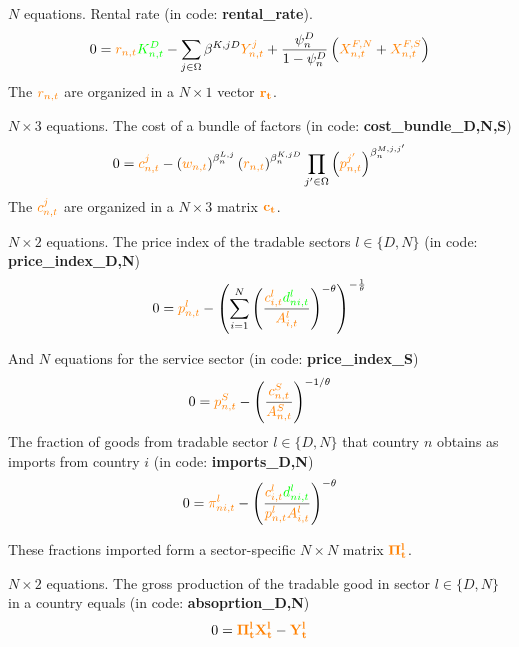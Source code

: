 \documentclass[12pt, bibtotoc, tablecaptionabove, figurecaptionabove, fleqn]{article}
\newcommand{\cl}[1]{{\color{orange}{#1}}}
\newcommand{\st}[1]{{\color{green}{#1}}}
\begin{document}
\noindent $N$ equations. Rental rate  (in code: {\bf{rental\_rate}}). 
\begin{equation}
  0 = \cl{r_{n, t}} \st{K_{n, t}^{D}}-\sum_{j \in \Omega} \beta^{K, j D} \cl{Y_{n, t}^{j}}+\frac{\psi^{D}_n} { 1-\psi^D_n }\left(\cl{X_{n, t}^{F, N}}+\cl{X_{n, t}^{F, S}}\right)
\end{equation}
The $\cl{r_{n,t}}$ are organized in a $ N \times 1$ vector $\mathbf{\cl{r_t}}$.

\noindent $N \times 3$ equations. The cost of a bundle of factors (in code: {\bf{cost\_bundle\_D,N,S}})
\begin{equation}
0 = \cl{c_{n, t}^{j}}-\left(\cl{w_{n, t}}\right)^{\beta_{n}^{L, j}}\left(\cl{r_{n, t}}\right)^{\beta_{n}^{K, j D}} \prod_{j^{\prime} \in \Omega}\left(\cl{p_{n, t}^{j^{\prime}}}\right)^{\beta_{n}^{M, j,j^{\prime}}}
\end{equation}
The $\cl{c^j_{n,t}}$ are organized in a $ N \times 3$ matrix $\mathbf{\cl{c_t}}$.


\noindent $N \times 2$ equations. The price index of the tradable sectors $l \in \{D,N\}$ (in code: {\bf{price\_index\_D,N}})
\begin{equation}
0 = \cl{p^l_{n,t}} - \left(\sum^{N}_{i=1} \left( \frac{\cl{c^l_{i,t}} \st{d^l_{ni,t}}}{\cl{A_{i,t}^l}} \right)^{-\theta} \right)^{-\frac{1}{\theta}}
\end{equation}

\noindent And $N$ equations for the service sector (in code: {\bf{price\_index\_S}})
\begin{equation}
0 = \cl{p^S_{n,t}} - \left(\frac{\cl{c_{n,t}^S}}{\cl{A^S_{n,t}}}\right)^{-1 / \theta}
\end{equation}
The fraction of goods from tradable sector $l \in \{D,N\}$ that country $n$ obtains as imports from country $i$ (in code: {\bf{imports\_D,N}})
\begin{equation}
0 = \cl{\pi^l_{ni,t}} - \left( \frac{\cl{c^l_{i,t}} \st{d^l_{ni,t}}}{\cl{p_{n,t}^l} \cl{A_{i,t}^l}} \right)^{-\theta}
\end{equation}


These fractions imported form a sector-specific $N \times N$ matrix $\mathbf{\cl{\Pi_t^l}}$.

\noindent $N \times 2$ equations. The gross production of the tradable good in sector $l \in \{D,N\}$ in a country equals (in code: {\bf{absoprtion\_D,N}})
\begin{equation}
0 = \mathbf{\cl{\Pi^l_t}}\mathbf{\cl{X^l_t}} -  \mathbf{\cl{Y^l_t}}
\end{equation}
\end{document}
